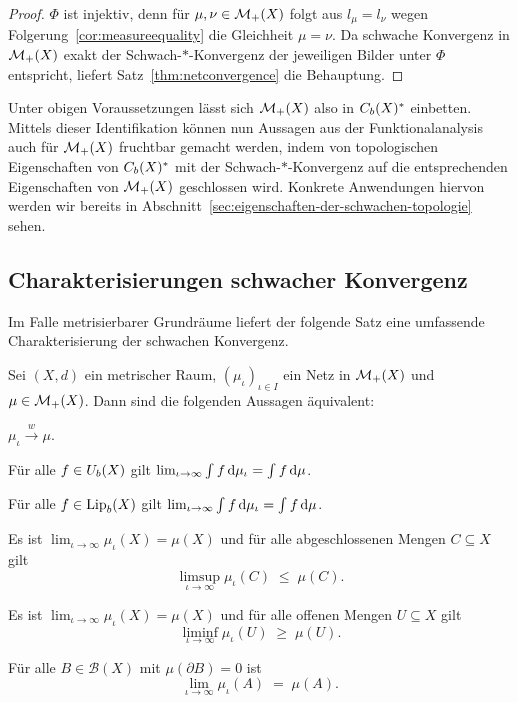 \documentclass[../main/main.tex]{subfiles}
\begin{document}
	\begin{proof}
		$\Phi$ ist injektiv, denn für $\mu, \nu \in \mathcal{M}_{+}(X)$ folgt aus $l_\mu = l_\nu$ wegen Folgerung~\ref{cor:measureequality} die Gleichheit $\mu = \nu$. 
		Da schwache Konvergenz in $\mathcal{M}_{+}(X)$ exakt der Schwach-$\ast$-Konvergenz der jeweiligen Bilder unter $\Phi$ entspricht, liefert Satz~\ref{thm:netconvergence}
		die Behauptung.
	\end{proof}

	Unter obigen Voraussetzungen lässt sich $\mathcal{M}_{+}(X)$ also in $C_b(X)^\ast$ einbetten. Mittels dieser Identifikation können nun Aussagen aus der 
	Funktionalanalysis auch für $\mathcal{M}_{+}(X)$ fruchtbar gemacht werden, indem von topologischen Eigenschaften von
	$C_b(X)^\ast$ mit der Schwach-$\ast$-Konvergenz auf die entsprechenden Eigenschaften von 
	$\mathcal{M}_{+}(X)$ geschlossen wird. Konkrete Anwendungen hiervon werden wir bereits in Abschnitt~\ref{sec:eigenschaften-der-schwachen-topologie} sehen.
	
	\subsection{Charakterisierungen schwacher Konvergenz}
	\label{subsec:CharakterisierungenSchwacherKonvergenz}
	
	Im Falle metrisierbarer Grundräume liefert der folgende Satz eine umfassende Charakterisierung der schwachen Konvergenz.
	
	\begin{Satz}[Portmanteau]
		\label{thm:portmanteau}
		Sei $(X, d)$ ein metrischer Raum, $(\mu_\iota)_{\iota \in I}$ ein Netz in $\mathcal{M}_{+}(X)$
		und $\mu \in \mathcal{M}_{+}(X)$. Dann sind die folgenden Aussagen äquivalent:
		\begin{equivalentthm}
			\item $\mu_\iota \xrightarrow{w} \mu$.
			\item Für alle $f \in U_b(X)$ gilt $\lim_{\iota \to \infty} \int_{} \, f \, \mathrm{d}\mu_\iota = \int_{} \, f \, \mathrm{d}\mu$.
			\item Für alle $f \in \mathrm{Lip}_b(X)$ gilt $\lim_{\iota \to \infty} \int_{} \, f \, \mathrm{d}\mu_\iota = \int_{} \, f \, \mathrm{d}\mu$.
			\item Es ist 
			$\lim_{\iota \to \infty} \mu_\iota(X) = \mu(X)$
			und für alle abgeschlossenen Mengen $C \subseteq X$ gilt 
			$$\limsup_{\iota \to \infty} \mu_\iota(C) \; \leq \; \mu(C) \text{.}$$
			\item Es ist 
			$\lim_{\iota \to \infty} \mu_\iota(X) = \mu(X)$
			und für alle offenen Mengen $U \subseteq X$ gilt 
			$$\liminf_{\iota \to \infty} \mu_\iota(U) \; \geq \; \mu(U) \text{.}$$
			\item Für alle $B \in \mathcal{B}(X)$ mit $\mu(\partial B) = 0$ 
			ist $$\lim_{\iota \to \infty} \mu_\iota(A) \; = \; \mu(A) \text{.}$$
		\end{equivalentthm}
	\end{Satz}
	
\end{document}
